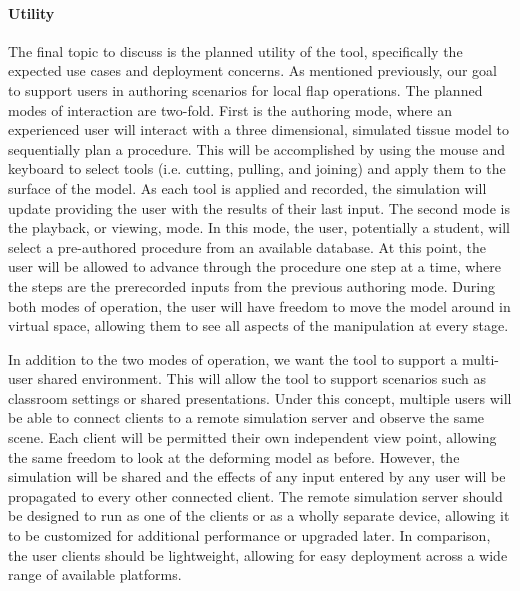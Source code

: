 \paragraph{Utility} 

The final topic to discuss is the planned utility of the tool,
specifically the expected use cases and deployment concerns. As
mentioned previously, our goal to support users in authoring scenarios for
local flap operations. The planned modes of interaction are
two-fold. First is the authoring mode, where an experienced user will
interact with a three dimensional, simulated tissue model to sequentially
plan a procedure. This will be accomplished by using the mouse and
keyboard to select tools (i.e. cutting, pulling, and joining) and apply
them to the surface of the model. As each tool is applied and recorded, the
simulation will update providing the user with the results of their
last input. The second mode is the playback, or viewing, mode. In this
mode, the user, potentially a student, will select a pre-authored
procedure from an available database. At this point, the user will be
allowed to advance through the procedure one step at a time, where the
steps are the prerecorded inputs from the previous authoring
mode. During both modes of operation, the user will have freedom to move the
model around in virtual space, allowing them to see all aspects of the
manipulation at every stage.

In addition to the two modes of operation, we want the tool to support
a multi-user shared environment. This will allow the tool to support
scenarios such as classroom settings or shared presentations. Under
this concept, multiple users will be able to connect clients to a
remote simulation server and observe the same scene. Each client will
be permitted their own independent view point, allowing the same
freedom to look at the deforming model as before. However, the
simulation will be shared and the effects of any input entered by any
user will be propagated to every other connected client. The remote
simulation server should be designed to run as one of the clients or
as a wholly separate device, allowing it to be customized for
additional performance or upgraded later. In comparison, the user
clients should be lightweight, allowing for easy deployment across a
wide range of available platforms.





